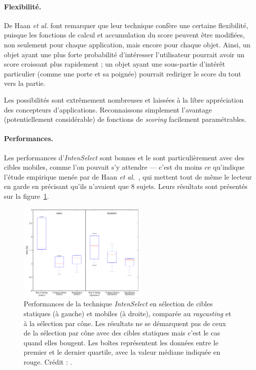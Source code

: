 	\paragraph{Flexibilité.}
	De Haan \emph{et al.} font remarquer que leur technique confère une certaine flexibilité, puisque les fonctions de calcul et accumulation du score peuvent être modifiées, non seulement pour chaque application, mais encore pour chaque objet. Ainsi, un objet ayant une plus forte probabilité d'intéresser l'utilisateur pourrait avoir un score croissant plus rapidement ; un objet ayant une sous-partie d'intérêt particulier (comme une porte et sa poignée) pourrait rediriger le score du tout vers la partie.
	
	Les possibilités sont extrêmement nombreuses et laissées à la libre appréciation des concepteurs d'applications. Reconnaissons simplement l'avantage (potentiellement considérable) de fonctions de \emph{scoring} facilement paramétrables.
	
	\paragraph{Performances.}
	Les performances d'\emph{IntenSelect} sont bonnes et le sont particulièrement avec des cibles mobiles, comme l'on pouvait s'y attendre --- c'est du moins ce qu'indique l'étude empirique menée par de Haan \emph{et al.}~\cite{de2005intenselect}, qui mettent tout de même le lecteur en garde en précisant qu'ils n'avaient que 8 sujets. Leurs résultats sont présentés sur la figure~\ref{fig:intensPerf}.
	
	\begin{figure}
		\centering
		\includegraphics[width=0.56\textwidth]{figures/ch2/intensPerf}
		\caption[\emph{IntenSelect} -- performances]{Performances de la technique \emph{IntenSelect} en sélection de cibles statiques (à gauche) et mobiles (à droite), comparée au \emph{raycasting} et à la sélection par cône. Les résultats ne se démarquent pas de ceux de la sélection par cône avec des cibles statiques mais c'est le cas quand elles bougent. Les boîtes représentent les données entre le premier et le dernier quartile, avec la valeur médiane indiquée en rouge. Crédit : \cite{de2005intenselect}.}
		\label{fig:intensPerf}
	\end{figure}
	
